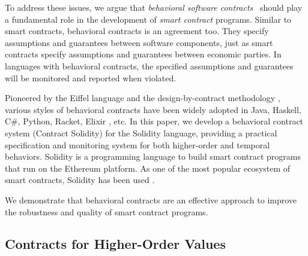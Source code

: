 To address these issues, we argue that \emph{behavioral software
contracts}~\cite{DBLP:conf/tools/Meyer98a} should play a fundamental role in
the development of \emph{smart contract} programs.
Similar to smart contracts, behavioral contracts is an agreement too. They
specify assumptions and guarantees between software components, just as
smart contracts specify assumptions and guarantees between economic parties.
In languages with behavioral contracts, the specified assumptions and
guarantees will be monitored and reported when violated.

Pioneered by the Eiffel language \cite{DBLP:books/ph/Meyer91} and the
design-by-contract methodology \cite{DBLP:conf/tools/Meyer98a}, various styles
of behavioral contracts have been widely adopted in Java, Haskell, C\#, Python,
Racket, Elixir \cite{DBLP:conf/erlang/0001BBHMEF22}, etc. 
In this paper, we develop a behavioral contract system \lang (Contract Solidity) for the Solidity
language, providing a practical specification and monitoring system
for both higher-order and temporal behaviors.
Solidity is a programming language to build smart contract programs that run on
the Ethereum platform.  As one of the most popular ecosystem of smart
contracts, Solidity has been used .

We demonstrate that behavioral contracts are an effective approach
to improve the robustness and quality of smart contract programs.




\subsection*{\textbf{Contracts for Higher-Order Values}}

